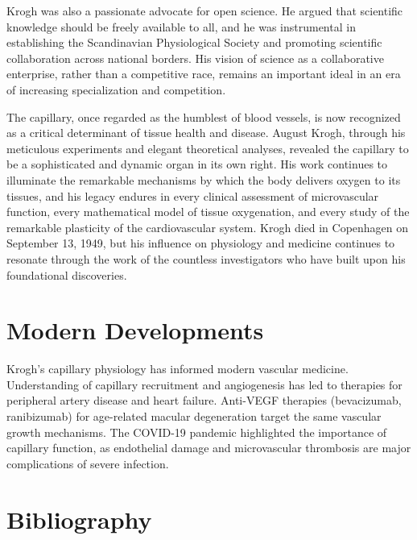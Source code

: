 Krogh was also a passionate advocate for open science. He argued that scientific knowledge should be freely available to all, and he was instrumental in establishing the Scandinavian Physiological Society and promoting scientific collaboration across national borders. His vision of science as a collaborative enterprise, rather than a competitive race, remains an important ideal in an era of increasing specialization and competition.

The capillary, once regarded as the humblest of blood vessels, is now recognized as a critical determinant of tissue health and disease. August Krogh, through his meticulous experiments and elegant theoretical analyses, revealed the capillary to be a sophisticated and dynamic organ in its own right. His work continues to illuminate the remarkable mechanisms by which the body delivers oxygen to its tissues, and his legacy endures in every clinical assessment of microvascular function, every mathematical model of tissue oxygenation, and every study of the remarkable plasticity of the cardiovascular system. Krogh died in Copenhagen on September 13, 1949, but his influence on physiology and medicine continues to resonate through the work of the countless investigators who have built upon his foundational discoveries.


\section{Modern Developments}

Krogh's capillary physiology has informed modern vascular medicine. Understanding of capillary recruitment and angiogenesis has led to therapies for peripheral artery disease and heart failure. Anti-VEGF therapies (bevacizumab, ranibizumab) for age-related macular degeneration target the same vascular growth mechanisms. The COVID-19 pandemic highlighted the importance of capillary function, as endothelial damage and microvascular thrombosis are major complications of severe infection.


\section{Bibliography}


